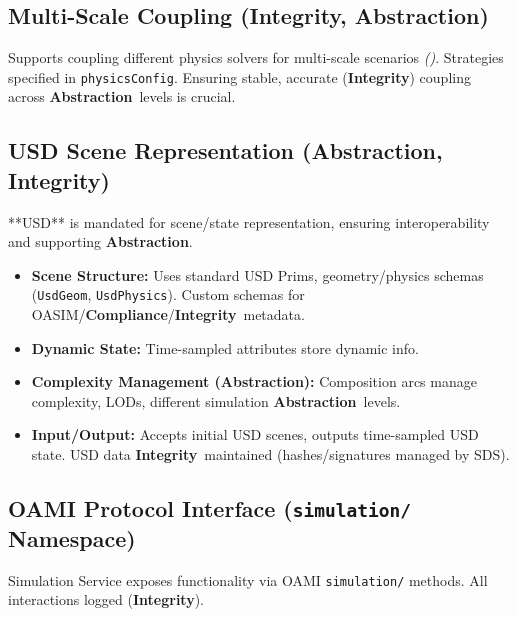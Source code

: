 \documentclass[12pt,a4paper]{report}
\renewcommand{\citep}[1]{\textit{\scriptsize{(\cite{#1})}}}
\newcommand{\Integrity}{\textbf{Integrity}}
\newcommand{\Abstraction}{\textbf{Abstraction}}
\begin{document}
	\subsection{Multi-Scale Coupling (\Integrity, \Abstraction)}
	\label{app:oasim_multiscale}
	Supports coupling different physics solvers for multi-scale scenarios \citep{MultiScaleVis_Ref1, MultiScaleVis_Ref13}. Strategies specified in \texttt{physicsConfig}. Ensuring stable, accurate (\Integrity) coupling across \Abstraction\ levels is crucial.
	
	\subsection{USD Scene Representation (\Abstraction, \Integrity)}
	\label{app:oasim_usd_representation}
	**USD** is mandated for scene/state representation, ensuring interoperability and supporting \Abstraction.
	\begin{itemize}
		\item \textbf{Scene Structure:} Uses standard USD Prims, geometry/physics schemas (\texttt{UsdGeom}, \texttt{UsdPhysics}). Custom schemas for OASIM/\textbf{Compliance}/\Integrity\ metadata.
		\item \textbf{Dynamic State:} Time-sampled attributes store dynamic info.
		\item \textbf{Complexity Management (\Abstraction):} Composition arcs manage complexity, LODs, different simulation \Abstraction\ levels.
		\item \textbf{Input/Output:} Accepts initial USD scenes, outputs time-sampled USD state. USD data \Integrity\ maintained (hashes/signatures managed by SDS).
	\end{itemize}
	
	\subsection{OAMI Protocol Interface (\texttt{simulation/} Namespace)}
	\label{app:oasim_sim_interface}
	
	Simulation Service exposes functionality via OAMI \texttt{simulation/} methods. All interactions logged (\Integrity).
	
\end{document}
